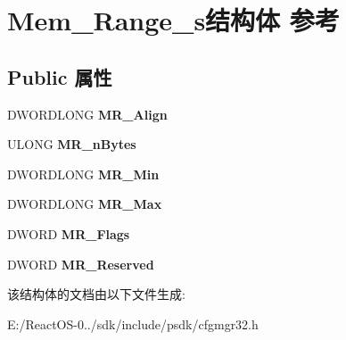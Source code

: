 \hypertarget{struct_mem___range__s}{}\section{Mem\+\_\+\+Range\+\_\+s结构体 参考}
\label{struct_mem___range__s}
\subsection*{Public 属性}
\begin{DoxyCompactItemize}
\item 
\mbox{\label{struct_mem___range__s_a51f9789c8b129f262804e6016a4f7ac2}} 
D\+W\+O\+R\+D\+L\+O\+NG {\bfseries M\+R\+\_\+\+Align}
\item 
\mbox{\label{struct_mem___range__s_a8b8029d70d86107412e5c66269b8a5f3}} 
U\+L\+O\+NG {\bfseries M\+R\+\_\+n\+Bytes}
\item 
\mbox{\label{struct_mem___range__s_aa4da51005d58f920675e4d23445f61ba}} 
D\+W\+O\+R\+D\+L\+O\+NG {\bfseries M\+R\+\_\+\+Min}
\item 
\mbox{\label{struct_mem___range__s_ae1345fffafa060ee1945c0dc8b3c5d74}} 
D\+W\+O\+R\+D\+L\+O\+NG {\bfseries M\+R\+\_\+\+Max}
\item 
\mbox{\label{struct_mem___range__s_abd1f003179878e2126248981f84b3441}} 
D\+W\+O\+RD {\bfseries M\+R\+\_\+\+Flags}
\item 
\mbox{\label{struct_mem___range__s_aa72042e78af390ecedbdc8978c508c3e}} 
D\+W\+O\+RD {\bfseries M\+R\+\_\+\+Reserved}
\end{DoxyCompactItemize}


该结构体的文档由以下文件生成\+:\begin{DoxyCompactItemize}
\item 
E\+:/\+React\+O\+S-\/0../sdk/include/psdk/cfgmgr32.\+h\end{DoxyCompactItemize}
